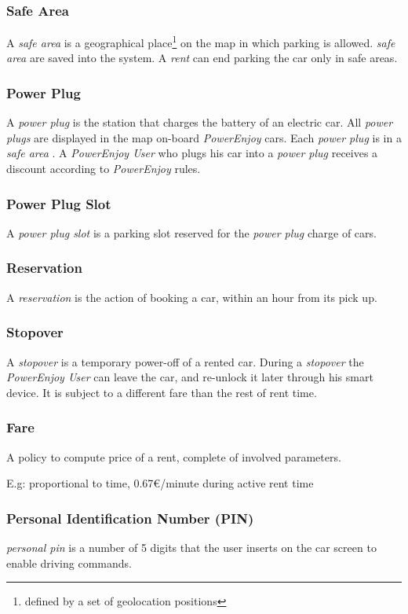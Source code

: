 \documentclass[english]{article}
\newcommand{\rent}{\textit{rent }}
\newcommand{\powerenjoy}{\textit{PowerEnjoy }}
\newcommand{\powerenjoyuser}{\textit{PowerEnjoy User }}
\newcommand{\safearea}{\textit{safe area }}
\newcommand{\powerplug}{\textit{power plug }}
\newcommand{\powerplugs}{\textit{power plugs }}
\newcommand{\resevation}{\textit{reservation }}
\newcommand{\stopover}{\textit{stopover }}
\newcommand{\personalpin}{\textit{personal pin }}
\newcommand{\powerplugslot}{\textit{power plug slot }}
\begin{document}
		\subsubsection {Safe Area}
			A \safearea is a  geographical place\footnote{defined by a set of geolocation positions} on the map in which parking is allowed. \safearea are saved into the system. A \rent can end parking the car only in safe areas.
	\subsubsection{Power Plug}
		A \powerplug is the station that charges the battery of an electric car. All \powerplugs are displayed in the map on-board \powerenjoy cars. Each \powerplug is in a \safearea. A \powerenjoyuser who plugs his car into a \powerplug receives a discount according to \powerenjoy rules.
	\subsubsection{Power Plug Slot}
		A \powerplugslot is a parking slot reserved for the \powerplug charge of cars.
	\subsubsection{Reservation}
		A \resevation is the action of booking a car, within an hour from its pick up.
	\subsubsection{Stopover}
		A \stopover is a temporary power-off of a rented car. During a \stopover the \powerenjoyuser can leave the car,  and re-unlock it later through his smart device. It is subject to a different fare than the rest of rent time.
	\subsubsection{Fare}
		A policy to compute price of a rent, complete of involved parameters. \par E.g: proportional to time, 0.67\euro/minute during active rent time 
	\subsubsection{Personal Identification Number (PIN)}
		 \personalpin is a number of 5 digits that the user inserts on the car screen to enable driving commands.
\end{document}
